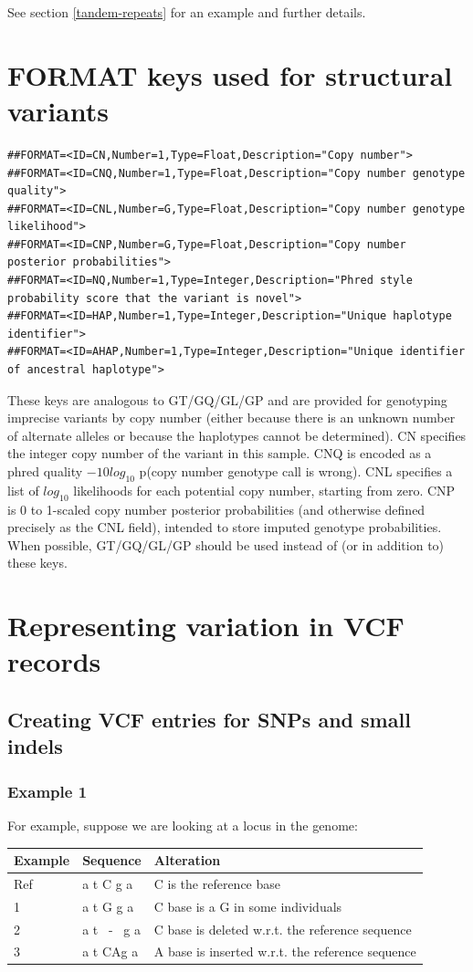 \documentclass[8pt]{article}
\begin{document}
See section \ref{tandem-repeats} for an example and further details.

\section{FORMAT keys used for structural variants}
\label{sv-format-keys}
\footnotesize
\begin{verbatim}
##FORMAT=<ID=CN,Number=1,Type=Float,Description="Copy number">
##FORMAT=<ID=CNQ,Number=1,Type=Float,Description="Copy number genotype quality">
##FORMAT=<ID=CNL,Number=G,Type=Float,Description="Copy number genotype likelihood">
##FORMAT=<ID=CNP,Number=G,Type=Float,Description="Copy number posterior probabilities">
##FORMAT=<ID=NQ,Number=1,Type=Integer,Description="Phred style probability score that the variant is novel">
##FORMAT=<ID=HAP,Number=1,Type=Integer,Description="Unique haplotype identifier">
##FORMAT=<ID=AHAP,Number=1,Type=Integer,Description="Unique identifier of ancestral haplotype">
\end{verbatim}
\normalsize
These keys are analogous to GT/GQ/GL/GP and are provided for genotyping imprecise variants by copy number (either because there is an unknown number of alternate alleles or because the haplotypes cannot be determined).
CN specifies the integer copy number of the variant in this sample.
CNQ is encoded as a phred quality $-10log_{10}$ p(copy number genotype call is wrong).
CNL specifies a list of $log_{10}$ likelihoods for each potential copy number, starting from zero.
CNP is 0 to 1-scaled copy number posterior probabilities (and otherwise defined precisely as the CNL field), intended to store imputed genotype probabilities.
When possible, GT/GQ/GL/GP should be used instead of (or in addition to) these keys.

\section{Representing variation in VCF records}
\subsection{Creating VCF entries for SNPs and small indels}
\subsubsection{Example 1}
For example, suppose we are looking at a locus in the genome:

\vspace{0.3cm}
\begin{tabular}{ | l | l | l | }
\hline
Example & Sequence & Alteration \\ \hline
Ref & a t C g a & C is the reference base \\ \hline
1   & a t G g a & C base is a G in some individuals \\ \hline
2   & a t \ - \ g a & C base is deleted w.r.t. the reference sequence\\ \hline
3   & a t CAg a & A base is inserted w.r.t. the reference sequence \\ \hline
\end{tabular}
\vspace{0.3cm}
\end{document}
